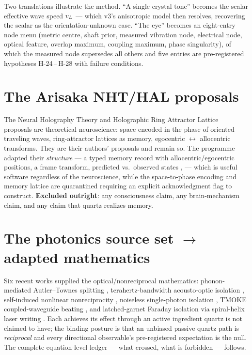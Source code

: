 \documentclass[10pt,letterpaper]{article}
\begin{document}
Two translations illustrate the method. ``A single crystal tone''
becomes the scalar effective wave speed $v_{L}$  --- which
v3's anisotropic model then resolves, recovering the scalar as the
orientation-unknown case. ``The eye'' becomes an eight-entry node menu
(metric centre, shaft prior, measured vibration node, electrical node,
optical feature, overlap maximum, coupling maximum, phase singularity),
of which the measured node supersedes all others and five entries are
pre-registered hypotheses H-24\,--\,H-28 with failure conditions.

\section{The Arisaka NHT/HAL proposals \SRC}
The Neural Holography Theory and Holographic Ring Attractor Lattice
proposals \citep{arisaka2022nht,arisaka2022vision,arisaka2023colloquium}
are theoretical neuroscience: space encoded in the phase of oriented
traveling waves, ring-attractor lattices as memory, egocentric
$\leftrightarrow$ allocentric transforms. They are their authors'
proposals and remain so. The programme adapted their \emph{structure}
--- a typed memory record with allocentric/egocentric positions, a frame
transform, predicted vs.\ observed states , \ENG{} ---
which is useful software regardless of the neuroscience, while the
space-to-phase encoding  and memory lattice
 are quarantined \HYP{} requiring an explicit
acknowledgment flag to construct. \textbf{Excluded outright}: any
consciousness claim, any brain-mechanism claim, and any claim that
quartz realizes memory.

\section{The photonics source set \SRC{} $\to$ adapted mathematics}
Six recent works supplied the optical/nonreciprocal mathematics:
phonon-mediated Autler--Townes splitting \citep{sohn2021phonon},
terahertz-bandwidth acousto-optic isolation \citep{cheng2024terahertz},
self-induced nonlinear nonreciprocity \citep{wang2025selfinduced},
noiseless single-photon isolation \citep{zhang2023noiseless}, TMOKE
coupled-waveguide beating \citep{chao2025tmoke}, and latched-garnet
Faraday isolation via spiral-helix laser writing
\citep{lapointe2023faraday}. Each achieves its effect through an active
ingredient quartz is not claimed to have; the binding posture is that an
unbiased passive quartz path is \emph{reciprocal} and every directional
observable's pre-registered expectation is the null. The complete
equation-level ledger --- what crossed, what is forbidden --- follows.

\end{document}
